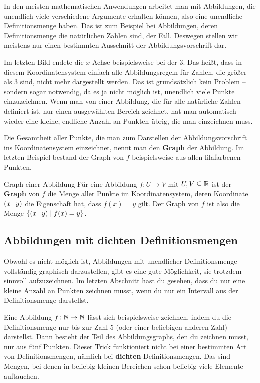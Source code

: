 \documentclass[../../main.tex]{subfiles}
\begin{document}
In den meisten mathematischen Anwendungen arbeitet man mit Abbildungen, die unendlich viele verschiedene Argumente erhalten können, also eine unendliche Definitionsmenge haben. Das ist zum Beispiel bei Abbildungen, deren Definitionsmenge die natürlichen Zahlen sind, der Fall. Deswegen stellen wir meistens nur einen bestimmten Ausschnitt der Abbildungsvorschrift dar.

Im letzten Bild endete die $x$-Achse beispielsweise bei der $3$. Das heißt, dass in diesem Koordinatensystem einfach alle Abbildungsregeln für Zahlen, die größer als $3$ sind, nicht mehr dargestellt werden. Das ist grundsätzlich kein Problem -- sondern sogar notwendig, da es ja nicht möglich ist, unendlich viele Punkte einzuzeichnen. Wenn man von einer Abbildung, die für alle natürliche Zahlen definiert ist, nur einen ausgewählten Bereich zeichnet, hat man automatisch wieder eine kleine, endliche Anzahl an Punkten übrig, die man einzeichnen muss.

Die Gesamtheit aller Punkte, die man zum Darstellen der Abbildungsvorschrift ins Koordinatensystem einzeichnet, nennt man den \textbf{Graph} der Abbildung. Im letzten Beispiel bestand der Graph von $f$ beispielsweise aus allen lilafarbenen Punkten.

\begin{definition}{Graph einer Abbildung}
        Für eine Abbildung $f\colon U\rightarrow V$ mit $U,V\subseteq \mathbb{R}$ ist der \textbf{Graph} von $f$ die Menge aller Punkte im Koordinatensystem, deren Koordinate $\left(x \:\middle|\: y\right)$ die Eigenschaft hat, dass $f(x)=y$ gilt. Der Graph von $f$ ist also die Menge $\{\left(x \:\middle|\: y\right) \mid f(x)=y\}$.
\end{definition}

\subsection{Abbildungen mit dichten Definitionsmengen}
\label{sec:abbildungen_graphen_stetig}

Obwohl es nicht möglich ist, Abbildungen mit unendlicher Definitionsmenge vollständig graphisch darzustellen, gibt es eine gute Möglichkeit, sie trotzdem sinnvoll aufzuzeichnen. Im letzten Abschnitt hast du gesehen, dass du nur eine kleine Anzahl an Punkten zeichnen musst, wenn du nur ein Intervall aus der Definitionsmenge darstellst. 

Eine Abbildung $f\colon\mathbb{N}\rightarrow\mathbb{N}$ lässt sich beispielsweise zeichnen, indem du die Definitionsmenge nur bis zur Zahl $5$ (oder einer beliebigen anderen Zahl) darstellst. Dann besteht der Teil des Abbildungsgraphs, den du zeichnen musst, nur aus fünf Punkten. Dieser Trick funktioniert nicht bei einer bestimmten Art von Definitionsmengen, nämlich bei \textbf{dichten} Definitionsmengen. Das sind Mengen, bei denen in beliebig kleinen Bereichen schon beliebig viele Elemente auftauchen.
\end{document}

